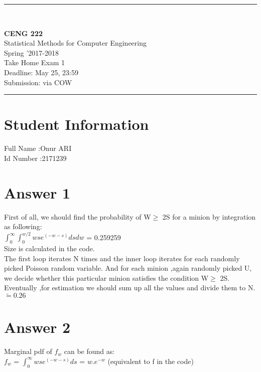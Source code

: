 \documentclass[12pt]{article}
\newcommand{\HRule}{\rule{\linewidth}{1mm}}
\begin{document}
\noindent
\HRule \\[3mm]
\begin{flushright}

                                         \LARGE \textbf{CENG 222}  \\[4mm]
                                         \Large Statistical Methods for Computer Engineering \\[4mm]
                                        \normalsize      Spring '2017-2018 \\
                                           \Large   Take Home Exam 1 \\
                    \normalsize Deadline: May 25, 23:59 \\
                    \normalsize Submission: via COW
\end{flushright}
\HRule

\section*{Student Information }
Full Name :Onur ARI  \\
Id Number :2171239  \\

\section*{Answer 1}
First of all, we should find the probability of W$\geq$ 2S for a minion by integration as following:\\

$\int_{0}^{\infty}\int_{0}^{w/2} ws e^{(-w-s)}dsdw$ = 0.259259 \\
Size is calculated in the code.	\\
The first loop iterates N times and the inner loop iterates for each randomly picked Poisson random variable.
And for each minion ,again randomly picked U, we decide whether this particular minion satisfies the condition W$\geq$ 2S.
Eventually ,for estimation we should sum up all the values and divide them to N. $ \widetilde{=} 0.26 $



\section*{Answer 2}
Marginal pdf of $f_w$ can be found as:\\
$f_w$ = $\int_{0}^{\infty} ws e^{(-w-s)}ds$ = $w.e^{-w}$ (equivalent to f in the code)
\end{document}
